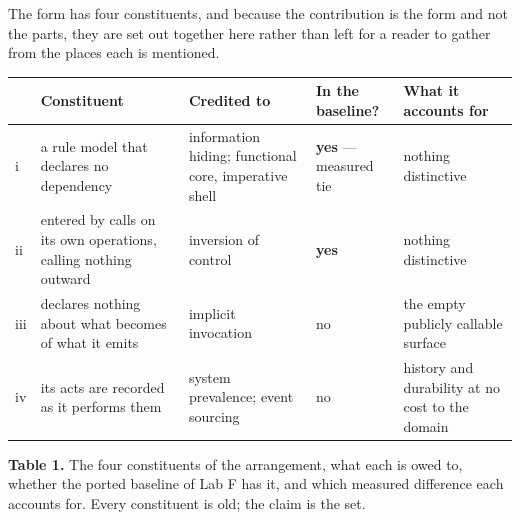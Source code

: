 \documentclass[
]{article}
\newcounter{none} %
\begin{document}
The form has four constituents, and because the contribution is the form
and not the parts, they are set out together here rather than left for a
reader to gather from the places each is mentioned.

{\def\LTcaptype{none} %
\begin{longtable}[]{@{}
  >{\raggedright\arraybackslash}p{}
  >{\raggedright\arraybackslash}p{}
  >{\raggedright\arraybackslash}p{}
  >{\raggedright\arraybackslash}p{}
  >{\raggedright\arraybackslash}p{}@{}}
\toprule\noalign{}
\begin{minipage}[b]{\linewidth}\raggedright
\end{minipage} & \begin{minipage}[b]{\linewidth}\raggedright
Constituent
\end{minipage} & \begin{minipage}[b]{\linewidth}\raggedright
Credited to
\end{minipage} & \begin{minipage}[b]{\linewidth}\raggedright
In the baseline?
\end{minipage} & \begin{minipage}[b]{\linewidth}\raggedright
What it accounts for
\end{minipage} \\
\midrule\noalign{}
\endhead
\bottomrule\noalign{}
\endlastfoot
i & a rule model that declares no dependency & information hiding;
functional core, imperative shell & \textbf{yes} --- measured tie &
nothing distinctive \\
ii & entered by calls on its own operations, calling nothing outward &
inversion of control & \textbf{yes} & nothing distinctive \\
iii & declares nothing about what becomes of what it emits & implicit
invocation & no & the empty publicly callable surface \\
iv & its acts are recorded as it performs them & system prevalence;
event sourcing & no & history and durability at no cost to the domain \\
\end{longtable}
}

\textbf{Table 1.} The four constituents of the arrangement, what each is
owed to, whether the ported baseline of Lab F has it, and which measured
difference each accounts for. Every constituent is old; the claim is the
set.
\end{document}
